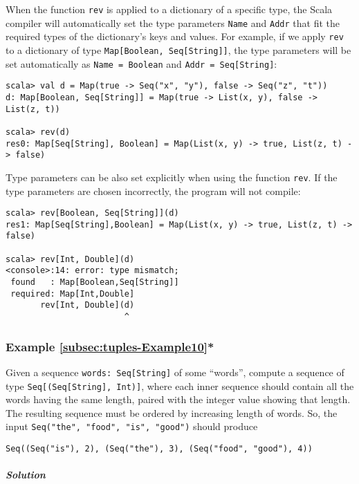 When the function \lstinline!rev! is applied to a dictionary of a
specific type, the Scala compiler will automatically set the type
parameters \lstinline!Name! and \lstinline!Addr! that fit the required
types of the dictionary\textsf{'}s keys and values. For example, if we apply
\lstinline!rev! to a dictionary of type \lstinline!Map[Boolean, Seq[String]]!,
the type parameters will be set automatically as \lstinline!Name = Boolean!
and \lstinline!Addr = Seq[String]!:
\begin{lstlisting}
scala> val d = Map(true -> Seq("x", "y"), false -> Seq("z", "t"))
d: Map[Boolean, Seq[String]] = Map(true -> List(x, y), false -> List(z, t))

scala> rev(d)
res0: Map[Seq[String], Boolean] = Map(List(x, y) -> true, List(z, t) -> false)
\end{lstlisting}
Type parameters can be also set explicitly when using the function
\lstinline!rev!. If the type parameters are chosen incorrectly, the
program will not compile:
\begin{lstlisting}
scala> rev[Boolean, Seq[String]](d)
res1: Map[Seq[String],Boolean] = Map(List(x, y) -> true, List(z, t) -> false)

scala> rev[Int, Double](d)
<console>:14: error: type mismatch;
 found   : Map[Boolean,Seq[String]]
 required: Map[Int,Double]
       rev[Int, Double](d)
                        ^
\end{lstlisting}


\subsubsection{Example \label{subsec:tuples-Example10}\ref{subsec:tuples-Example10}{*}}

Given a sequence \lstinline!words: Seq[String]! of some \textsf{``}words\textsf{''},
compute a sequence of type \lstinline!Seq[(Seq[String], Int)]!, where
each inner sequence should contain all the words having the same length,
paired with the integer value showing that length. The resulting sequence
must be ordered by increasing length of words. So, the input \lstinline!Seq("the", "food", "is", "good")!
should produce 
\begin{lstlisting}
Seq((Seq("is"), 2), (Seq("the"), 3), (Seq("food", "good"), 4))
\end{lstlisting}


\subparagraph{Solution}


